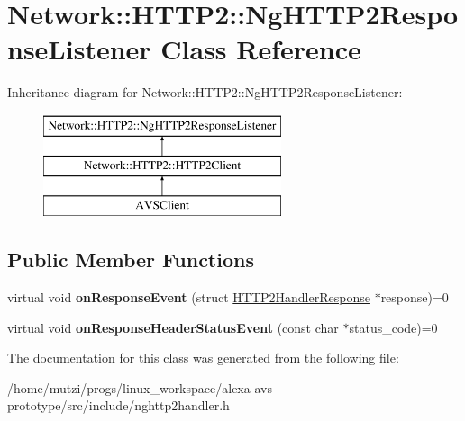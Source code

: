 \hypertarget{classNetwork_1_1HTTP2_1_1NgHTTP2ResponseListener}{}\section{Network\+:\+:H\+T\+T\+P2\+:\+:Ng\+H\+T\+T\+P2\+Response\+Listener Class Reference}
\label{classNetwork_1_1HTTP2_1_1NgHTTP2ResponseListener}
Inheritance diagram for Network\+:\+:H\+T\+T\+P2\+:\+:Ng\+H\+T\+T\+P2\+Response\+Listener\+:\begin{figure}[H]
\begin{center}
\leavevmode
\includegraphics[height=3.000000cm]{d0/d27/classNetwork_1_1HTTP2_1_1NgHTTP2ResponseListener}
\end{center}
\end{figure}
\subsection*{Public Member Functions}
\begin{DoxyCompactItemize}
\item 
\mbox{\label{classNetwork_1_1HTTP2_1_1NgHTTP2ResponseListener_a063ae0ea63ee29845b589cd23e97495a}} 
virtual void {\bfseries on\+Response\+Event} (struct \hyperlink{structNetwork_1_1HTTP2_1_1HTTP2HandlerResponse}{H\+T\+T\+P2\+Handler\+Response} $\ast$response)=0
\item 
\mbox{\label{classNetwork_1_1HTTP2_1_1NgHTTP2ResponseListener_a69e9cb5d6ffb457d8e41ed29e675ad46}} 
virtual void {\bfseries on\+Response\+Header\+Status\+Event} (const char $\ast$status\+\_\+code)=0
\end{DoxyCompactItemize}


The documentation for this class was generated from the following file\+:\begin{DoxyCompactItemize}
\item 
/home/mutzi/progs/linux\+\_\+workspace/alexa-\/avs-\/prototype/src/include/nghttp2handler.\+h\end{DoxyCompactItemize}
